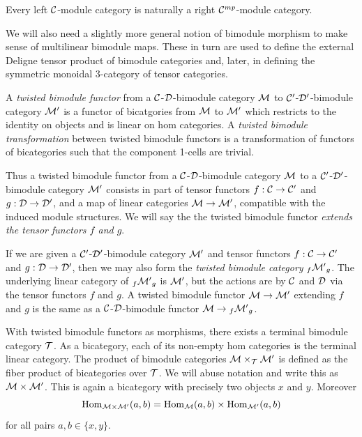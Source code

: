 \documentclass{amsart}
\begin{document}
\begin{remark}
 	Every left $\mathcal C$-module category is naturally a right $\mathcal C^{mp}$-module category. 
\end{remark}

We will also need a slightly more general notion of bimodule morphism to make sense of multilinear bimodule maps. These in turn are used to define the external Deligne tensor product of bimodule categories and, later,  in defining the symmetric monoidal 3-category of tensor categories. 

\begin{definition}
	A {\em twisted bimodule functor} from a $\mathcal C$-$\mathcal D$-bimodule category $\mathcal M$  to $\mathcal C'$-$\mathcal D'$-bimodule category $\mathcal M'$ is a functor of bicatgories from $\mathcal M$ to $\mathcal M'$ which restricts to the identity on objects and is linear on hom categories. A {\em twisted bimodule transformation} between twisted bimodule functors is a transformation of functors of bicategories such that the component 1-cells are trivial.
\end{definition}

Thus a twisted bimodule functor from a $\mathcal C$-$\mathcal D$-bimodule category $\mathcal M$ to a $\mathcal C'$-$\mathcal D'$-bimodule category $\mathcal M'$ consists in part of tensor functors $f:\mathcal C \to \mathcal C'$ and $g:\mathcal D \to \mathcal D'$, and a map of linear categories $\mathcal M \to \mathcal M'$, compatible with the induced module structures. We will say the the twisted bimodule functor {\em extends the tensor functors $f$ and $g$}. 

If we are given a $\mathcal C'$-$\mathcal D'$-bimodule category $\mathcal M'$ and tensor functors $f:\mathcal C \to \mathcal C'$ and $g:\mathcal D \to \mathcal D'$, then we may also form the {\em twisted bimodule category} ${}_f{\mathcal M'}_g$.
The underlying linear category of ${}_f{\mathcal M'}_g$ is $\mathcal M'$, but the actions are by $\mathcal C$ and $\mathcal D$ via the tensor functors $f$ and $g$. A twisted bimodule functor $\mathcal M \to \mathcal M'$ extending $f$ and $g$ is the same as a $\mathcal C$-$\mathcal D$-bimodule functor $\mathcal M \to {}_f{\mathcal M'}_g$. 

With twisted bimodule functors as morphisms, there exists a terminal bimodule category $\mathcal T$. As a bicategory, each of its non-empty hom categories is the terminal linear category. The product of bimodule categories $\mathcal M \times_{\mathcal T} \mathcal M'$ is defined as the fiber product of bicategories over $\mathcal T$. We will abuse notation and write this as $\mathcal M \times \mathcal M'$. This is again a bicategory with precisely two objects $x$ and $y$. Moreover
\begin{equation*}
	\operatorname{Hom}_{\mathcal M \times \mathcal M'}(a,b) = \operatorname{Hom}_\mathcal M(a,b) \times \operatorname{Hom}_{\mathcal M'}(a,b)
\end{equation*}
for all pairs $a,b \in \{ x,y \}$.
\end{document}
